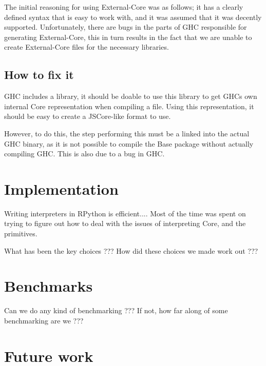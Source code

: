 The initial reasoning for using External-Core was as follows;
it has a clearly defined syntax that is easy to work with, and it was 
assumed that it was decently supported. Unfortunately, there are bugs in
the parts of GHC responsible for generating External-Core, this in turn
results in the fact that we are unable to create External-Core files for the
necessary libraries.


\subsection{How to fix it}


GHC includes a library, it should be doable to use this library to get
GHCs own internal Core representation when compiling a file. Using this 
representation, it should be easy to create a JSCore-like format to use.

However, to do this, the step performing this must be a linked into the
actual GHC binary, as it is not possible to compile the Base package without
actually compiling GHC. This is also due to a bug in GHC.













\section{Implementation}

Writing interpreters in RPython is efficient.... Most of the time was spent on
trying to figure out how to deal with the issues of interpreting Core, and the
primitives.

What has been the key choices ??? How did these choices we made work out ???

\section{Benchmarks}

Can we do any kind of benchmarking ??? If not, how far along of some 
benchmarking are we ???

\section{Future work}

